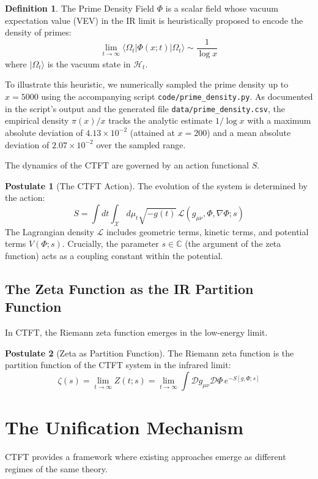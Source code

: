 \documentclass[11pt, a4paper]{article}
\theoremstyle{definition}
\newtheorem{definition}{Definition}[section]
\newtheorem{postulate}{Postulate}
\newcommand{\C}{\mathbb{C}}
\newcommand{\CTS}{\mathcal{X}}
\newcommand{\Lagr}{\mathcal{L}}
\newcommand{\Hilb}{\mathcal{H}}
\begin{document}
\begin{definition}
The Prime Density Field $\Phi$ is a scalar field whose vacuum expectation value (VEV) in the IR limit is heuristically proposed to encode the density of primes:
$$ \lim_{t\to\infty} \langle \Omega_t | \Phi(x; t) | \Omega_t \rangle \sim \frac{1}{\log x} $$
where $|\Omega_t\rangle$ is the vacuum state in $\Hilb_t$.
\end{definition}

    To illustrate this heuristic, we numerically sampled the prime density up to $x=5000$ using the accompanying script \texttt{code/prime\_density.py}. As documented in the script's output and the generated file \texttt{data/prime\_density.csv}, the empirical density $\pi(x)/x$ tracks the analytic estimate $1/\log x$ with a maximum absolute deviation of $4.13\times 10^{-2}$ (attained at $x=200$) and a mean absolute deviation of $2.07\times10^{-2}$ over the sampled range.

The dynamics of the CTFT are governed by an action functional $S$.

\begin{postulate}[The CTFT Action]
The evolution of the system is determined by the action:
$$ S = \int dt \int_{\CTS} d\mu_t \sqrt{-g(t)} \, \Lagr(g_{\mu\nu}, \Phi, \nabla\Phi; s) $$
The Lagrangian density $\Lagr$ includes geometric terms, kinetic terms, and potential terms $V(\Phi; s)$. Crucially, the parameter $s \in \C$ (the argument of the zeta function) acts as a coupling constant within the potential.
\end{postulate}

\subsection{The Zeta Function as the IR Partition Function}
In CTFT, the Riemann zeta function emerges in the low-energy limit.

\begin{postulate}[Zeta as Partition Function]
The Riemann zeta function is the partition function of the CTFT system in the infrared limit:
$$ \zeta(s) = \lim_{t\to\infty} Z(t; s) = \lim_{t\to\infty} \int \mathcal{D}g_{\mu\nu} \mathcal{D}\Phi \, e^{-S[g, \Phi; s]} $$
\end{postulate}

\section{The Unification Mechanism}
CTFT provides a framework where existing approaches emerge as different regimes of the same theory.
\end{document}
